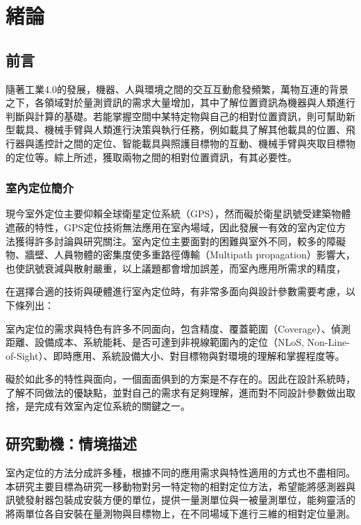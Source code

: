 \chapter{緒論}


\section{前言} %

隨著工業4.0的發展，機器、人與環境之間的交互互動愈發頻繁，萬物互連的背景之下，各領域對於量測資訊的需求大量增加，其中了解位置資訊為機器與人類進行判斷與計算的基礎。若能掌握空間中某特定物與自己的相對位置資訊，則可幫助新型載具、機械手臂與人類進行決策與執行任務，例如載具了解其他載具的位置、飛行器與遙控計之間的定位、智能載具與照護目標物的互動、機械手臂與夾取目標物的定位等。綜上所述，獲取兩物之間的相對位置資訊，有其必要性。





\subsection{室內定位簡介}
現今室外定位主要仰賴全球衛星定位系統（GPS），然而礙於衛星訊號受建築物體遮蔽的特性，GPS定位技術無法應用在室內場域，因此發展一有效的室內定位方法獲得許多討論與研究關注。室內定位主要面對的困難與室外不同，較多的障礙物、牆壁、人員物體的密集度使多重路徑傳輸（Multipath propagation）影響大，也使訊號衰減與散射嚴重，以上議題都會增加誤差，而室內應用所需求的精度，

在選擇合適的技術與硬體進行室內定位時，有非常多面向與設計參數需要考慮，以下條列出：

室內定位的需求與特色有許多不同面向，包含精度、覆蓋範圍（Coverage）、偵測距離、設備成本、系統能耗、是否可達到非視線範圍內的定位（NLoS, Non-Line-of-Sight）、即時應用、系統設備大小、對目標物與對環境的理解和掌握程度等。

礙於如此多的特性與面向，一個面面俱到的方案是不存在的。因此在設計系統時，了解不同做法的優缺點，並對自己的需求有足夠理解，進而對不同設計參數做出取捨，是完成有效室內定位系統的關鍵之一。





\section{研究動機：情境描述}
室內定位的方法分成許多種，根據不同的應用需求與特性適用的方式也不盡相同。本研究主要目標為研究一移動物對另一特定物的相對定位方法，希望能將感測器與訊號發射器包裝成安裝方便的單位，提供一量測單位與一被量測單位，能夠靈活的將兩單位各自安裝在量測物與目標物上，在不同場域下進行三維的相對定位量測。


